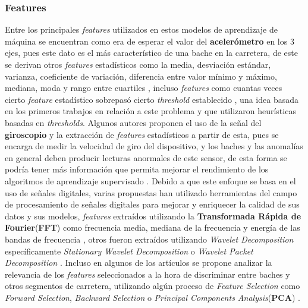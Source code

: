 		\subsubsection{Features}
			Entre los principales \emph{features} utilizados en estos modelos de aprendizaje de máquina se encuentran como era de esperar el valor 
			del \textbf{acelerómetro} en los 3 ejes, pues este dato es el más característico de una bache en la carretera, de este se derivan otros
			\emph{features} estadísticos como la media, desviación estándar, varianza, coeficiente de variación, diferencia entre valor mínimo y
			máximo, mediana, moda y rango entre cuartiles , incluso \emph{features} como cuantas veces cierto \emph{feature} estadístico sobrepasó cierto \emph{threshold}
			establecido , una idea basada en los primeros trabajos en relación a este problema y que utilizaron
			heurísticas basadas en \emph{thresholds}. Algunos autores proponen el uso de la señal del \textbf{giroscopio} y la extracción de \emph
			{features} estadísticos a partir de esta, pues se encarga de medir la velocidad de giro del dispositivo, y los baches y las anomalías
			en general deben producir lecturas anormales de este sensor, de esta forma se podría tener más información que permita mejorar el
			rendimiento de los algoritmos de aprendizaje supervisado . Debido a que este enfoque
			se basa en el uso de señales digitales, varias propuestas han utilizado herramientas del campo de procesamiento de señales digitales
			para mejorar y enriquecer la calidad de sus datos y sus modelos, \emph{features} extraídos utilizando la \textbf{Transformada Rápida
			de Fourier}(\textbf{FFT}) como frecuencia media, mediana de la frecuencia y energía de las bandas de frecuencia , otros fueron extraídos utilizando \emph{Wavelet Decomposition} específicamente \emph{Stationary Wavelet
			Decomposition}  o \emph{Wavelet Packet Decomposition} . Incluso en algunos de
			los artículos se propone analizar la relevancia de los \emph {features} seleccionados a la hora de discriminar entre baches y otros
			segmentos de carretera, utilizando algún proceso de \emph{Feature Selection} como \emph{Forward Selection}, \emph{Backward Selection}
			o \emph{Principal Components Analysis}(\textbf{PCA}) .

